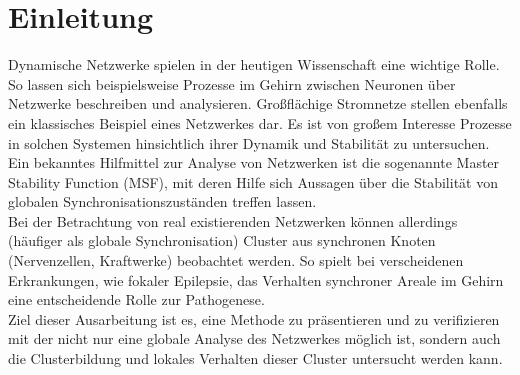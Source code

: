 \section{Einleitung}\label{einleitung}
Dynamische Netzwerke spielen in der heutigen Wissenschaft eine wichtige Rolle. So lassen sich beispielsweise Prozesse im Gehirn zwischen Neuronen über Netzwerke beschreiben und analysieren\cite{neuron}. Großflächige Stromnetze stellen ebenfalls ein klassisches Beispiel eines Netzwerkes dar\cite{power}. Es ist von großem Interesse Prozesse in solchen Systemen hinsichtlich ihrer Dynamik und Stabilität zu untersuchen. Ein bekanntes Hilfmittel zur Analyse von Netzwerken ist die sogenannte Master Stability Function (MSF), mit deren Hilfe sich Aussagen über die Stabilität von globalen Synchronisationszuständen treffen lassen.\\
Bei der Betrachtung von real existierenden Netzwerken können allerdings (häufiger als globale Synchronisation) Cluster aus synchronen Knoten (Nervenzellen, Kraftwerke) beobachtet werden. So spielt bei verscheidenen Erkrankungen, wie fokaler Epilepsie, das Verhalten synchroner Areale im Gehirn eine entscheidende Rolle zur Pathogenese\cite{neuron}.\\
Ziel dieser Ausarbeitung ist es, eine Methode zu präsentieren und zu verifizieren mit der nicht nur eine globale Analyse des Netzwerkes möglich ist, sondern auch die Clusterbildung und lokales Verhalten dieser Cluster untersucht werden kann.